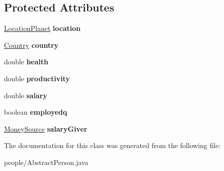 \subsection*{Protected Attributes}
\begin{DoxyCompactItemize}
\item 
\hyperlink{classplanets_1_1_location_planet}{Location\+Planet} {\bfseries location}\hypertarget{classpeople_1_1_abstract_person_a6b873db49e3764d1ef446a9f42959aa2}{}\label{classpeople_1_1_abstract_person_a6b873db49e3764d1ef446a9f42959aa2}

\item 
\hyperlink{classplanets_1_1_country}{Country} {\bfseries country}\hypertarget{classpeople_1_1_abstract_person_aa5af9f8b9b72d6289ab148043239f76a}{}\label{classpeople_1_1_abstract_person_aa5af9f8b9b72d6289ab148043239f76a}

\item 
double {\bfseries health}\hypertarget{classpeople_1_1_abstract_person_ac9b04ed7a74d01315cea5de8a856e9b9}{}\label{classpeople_1_1_abstract_person_ac9b04ed7a74d01315cea5de8a856e9b9}

\item 
double {\bfseries productivity}\hypertarget{classpeople_1_1_abstract_person_ac795cfe728b6d954058c3a1f9f427960}{}\label{classpeople_1_1_abstract_person_ac795cfe728b6d954058c3a1f9f427960}

\item 
double {\bfseries salary}\hypertarget{classpeople_1_1_abstract_person_a7f2ef164916f2c1f4a7841af5413c0f9}{}\label{classpeople_1_1_abstract_person_a7f2ef164916f2c1f4a7841af5413c0f9}

\item 
boolean {\bfseries employedq}\hypertarget{classpeople_1_1_abstract_person_a2ed9cb36822c07e8b86b44cc90983717}{}\label{classpeople_1_1_abstract_person_a2ed9cb36822c07e8b86b44cc90983717}

\item 
\hyperlink{classuniverse_1_1_money_source}{Money\+Source} {\bfseries salary\+Giver}\hypertarget{classpeople_1_1_abstract_person_ac6bbf0965395c7ec2457139173e34b2b}{}\label{classpeople_1_1_abstract_person_ac6bbf0965395c7ec2457139173e34b2b}

\end{DoxyCompactItemize}


The documentation for this class was generated from the following file\+:\begin{DoxyCompactItemize}
\item 
people/Abstract\+Person.\+java\end{DoxyCompactItemize}
